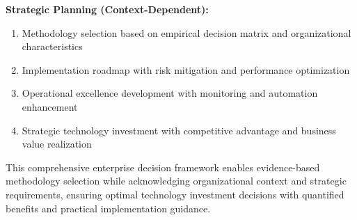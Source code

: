 \textbf{Strategic Planning (Context-Dependent):}
\begin{enumerate}
\item Methodology selection based on empirical decision matrix and organizational characteristics
\item Implementation roadmap with risk mitigation and performance optimization
\item Operational excellence development with monitoring and automation enhancement
\item Strategic technology investment with competitive advantage and business value realization
\end{enumerate}

This comprehensive enterprise decision framework enables evidence-based methodology selection while acknowledging organizational context and strategic requirements, ensuring optimal technology investment decisions with quantified benefits and practical implementation guidance.